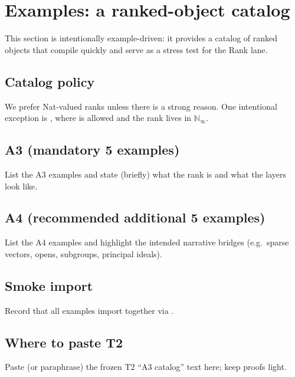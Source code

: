 \section{Examples: a ranked-object catalog}
\label{sec:examples}

This section is intentionally example-driven: it provides a catalog of ranked objects that
compile quickly and serve as a stress test for the Rank lane.

\subsection{Catalog policy}
We prefer Nat-valued ranks unless there is a strong reason. One intentional exception is
, where  is allowed and the rank lives in $\mathbb{N}_\infty$.

\subsection{A3 (mandatory 5 examples)}
List the A3 examples and state (briefly) what the rank is and what the layers look like.

\subsection{A4 (recommended additional 5 examples)}
List the A4 examples and highlight the intended narrative bridges (e.g.\ sparse vectors, opens,
subgroups, principal ideals).

\subsection{Smoke import}
Record that all examples import together via .

\subsection{Where to paste T2}
Paste (or paraphrase) the frozen T2 “A3 catalog” text here; keep proofs light.

